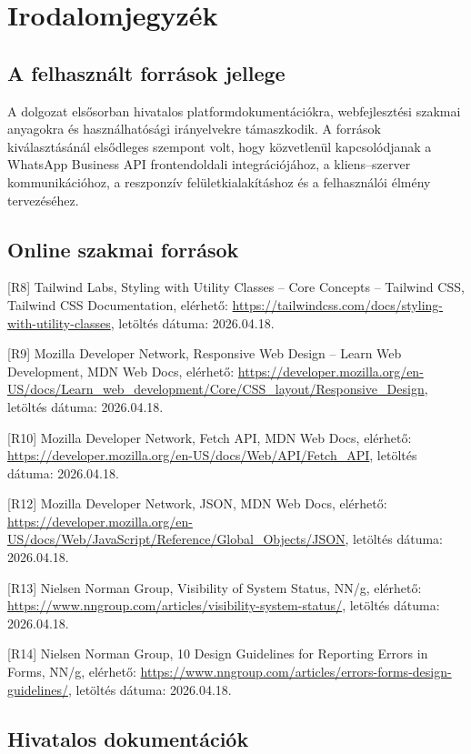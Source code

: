 \chapter{Irodalomjegyzék}
\begin{sloppypar}

\section{A felhasznált források jellege}

A dolgozat elsősorban hivatalos platformdokumentációkra, webfejlesztési szakmai anyagokra és használhatósági irányelvekre támaszkodik. A források kiválasztásánál elsődleges szempont volt, hogy közvetlenül kapcsolódjanak a WhatsApp Business API frontendoldali integrációjához, a kliens--szerver kommunikációhoz, a reszponzív felületkialakításhoz és a felhasználói élmény tervezéséhez.

\section{Online szakmai források}

[R8] Tailwind Labs, Styling with Utility Classes -- Core Concepts -- Tailwind CSS, Tailwind CSS Documentation, elérhető: \url{https://tailwindcss.com/docs/styling-with-utility-classes}, letöltés dátuma: 2026.04.18.

[R9] Mozilla Developer Network, Responsive Web Design -- Learn Web Development, MDN Web Docs, elérhető: \url{https://developer.mozilla.org/en-US/docs/Learn_web_development/Core/CSS_layout/Responsive_Design}, letöltés dátuma: 2026.04.18.

[R10] Mozilla Developer Network, Fetch API, MDN Web Docs, elérhető: \url{https://developer.mozilla.org/en-US/docs/Web/API/Fetch_API}, letöltés dátuma: 2026.04.18.

[R12] Mozilla Developer Network, JSON, MDN Web Docs, elérhető: \url{https://developer.mozilla.org/en-US/docs/Web/JavaScript/Reference/Global_Objects/JSON}, letöltés dátuma: 2026.04.18.

[R13] Nielsen Norman Group, Visibility of System Status, NN/g, elérhető: \url{https://www.nngroup.com/articles/visibility-system-status/}, letöltés dátuma: 2026.04.18.

[R14] Nielsen Norman Group, 10 Design Guidelines for Reporting Errors in Forms, NN/g, elérhető: \url{https://www.nngroup.com/articles/errors-forms-design-guidelines/}, letöltés dátuma: 2026.04.18.

\section{Hivatalos dokumentációk}


\end{sloppypar}
